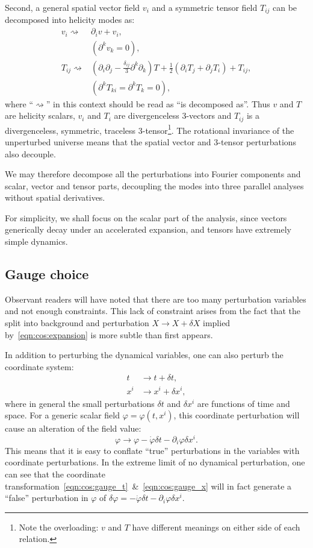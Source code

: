 Second, a general spatial vector field \(v_i\) and a symmetric tensor field \(T_{ij}\) can be decomposed into helicity modes as:
\begin{align}
  v_i \rightsquigarrow& \partial_i v + v_i,   \nonumber\\
  &(\partial^k v_k=0), \\
  T_{ij} \rightsquigarrow& (\partial_i\partial_j - \frac{\delta_{ij}}{3}\partial^k\partial_k)T + \frac{1}{2}(\partial_i T_j + \partial_j T_i) + T_{ij} \nonumber,\\ 
  &(\partial^k T_{ki} = \partial^k T_k = 0),
\end{align}
where ``\(\rightsquigarrow\)'' in this context should be read as ``is decomposed as''.
Thus \(v\) and \(T\) are helicity scalars, \(v_i\) and \(T_i\) are divergenceless 3-vectors and \(T_{ij}\) is a divergenceless, symmetric, traceless 3-tensor\footnote{Note the overloading: \(v\) and \(T\) have different meanings on either side of each relation.}.
  The rotational invariance of the unperturbed universe means that the spatial vector and 3-tensor perturbations also decouple.

We may therefore decompose all the perturbations into Fourier components and scalar, vector and tensor parts, decoupling the modes into three parallel analyses without spatial derivatives.

For simplicity, we shall focus on the scalar part of the analysis, since vectors generically decay under an accelerated expansion, and tensors have extremely simple dynamics.

\subsection{Gauge choice}
Observant readers will have noted that there are too many perturbation variables and not enough constraints.
This lack of constraint arises from the fact that the split into background and perturbation \(X\to X+\delta X\) implied by~\eqref{eqn:cos:expansion} is more subtle than first appears. 

In addition to perturbing the dynamical variables, one can also perturb the coordinate system:
\begin{align}
  t &\rightarrow t + \delta t,
  \label{eqn:cos:gauge_t}
  \\
  x^i &\rightarrow x^i  + \delta x^i,
  \label{eqn:cos:gauge_x}
\end{align}
where in general the small perturbations \(\delta t\) and \(\delta x^i\) are functions of time and space.
For a generic scalar field \(\varphi = \varphi(t,x^i)\), this coordinate perturbation will cause an alteration of the field value:
\begin{equation}
  \varphi \rightarrow \varphi - \dot{\varphi}\delta t - \partial_i\varphi\delta x^i.
\end{equation}
This means that it is easy to conflate ``true'' perturbations in the variables with coordinate perturbations. In the extreme limit of no dynamical perturbation, one can see that the coordinate transformation~\eqref{eqn:cos:gauge_t}~\&~\eqref{eqn:cos:gauge_x} will in fact generate a ``false'' perturbation in \(\varphi\) of \(\delta\varphi = -\dot{\varphi}\delta t - \partial_i\varphi\delta x^i\).

